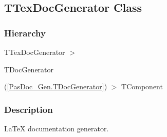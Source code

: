 \documentclass{report}
\begin{document}
\subsection*{TTexDocGenerator Class}
\fi
\label{PasDoc_GenLatex.TTexDocGenerator}
\subsubsection*{\large{\textbf{Hierarchy}}\normalsize\hspace{1ex}\hfill}
TTexDocGenerator {$>$} \begin{ttfamily}TDocGenerator\end{ttfamily}(\ref{PasDoc_Gen.TDocGenerator}) {$>$} 
TComponent
\subsubsection*{\large{\textbf{Description}}\normalsize\hspace{1ex}\hfill}
LaTeX documentation generator.\hfill\vspace*{1ex}
\end{document}
